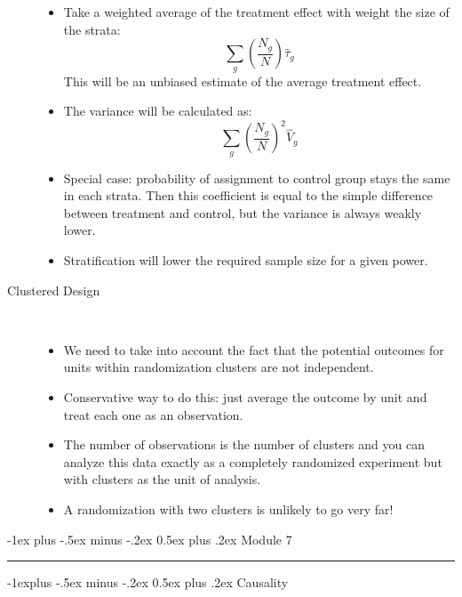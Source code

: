 \documentclass[a4paper,10pt,landscape]{article}
\makeatletter
\renewcommand{\section}{\@startsection{section}{1}{0mm}%
                                {-1ex plus -.5ex minus -.2ex}%
                                {0.5ex plus .2ex}%
                                {\normalfont\large\bfseries}}
\renewcommand{\subsection}{\@startsection{subsection}{2}{0mm}%
                                {-1explus -.5ex minus -.2ex}%
                                {0.5ex plus .2ex}%
                                {\normalfont\normalsize\bfseries}}
\makeatother
\begin{document}
\begin{multicols*}{3}
\begin{description}
\begin{itemize}[itemsep=0pt]
		\item Take a weighted average of the treatment effect with weight the size of the strata:
		$$\sum_{g}\left(\frac{N_g}{N}\right)\hat{\tau}_g$$
		This will be an unbiased estimate of the average treatment effect.
		\item The variance will be calculated as:
		$$\sum_{g}\left(\frac{N_g}{N}\right)^2\hat{V}_g$$
		\item Special case: probability of assignment to control group stays the same in each strata. Then this coefficient is equal to the simple difference between treatment and control, but the variance is always weakly lower.
		\item Stratification will lower the required sample size for a given power.
	\end{itemize}
	\item[Clustered Design] ~
	\begin{itemize}[noitemsep,topsep=0pt]
		\item We need to take into account the fact that the potential outcomes for units within randomization clusters are not independent.
		\item Conservative way to do this: just average the outcome by unit and treat each one as an observation.
		\item The number of observations is the number of clusters and you can analyze this data exactly as a completely randomized experiment but with clusters as the unit of analysis.
		\item A randomization with two clusters is unlikely to go very far!
	\end{itemize}
\end{description}

\section{Module 7}\smallskip \hrule height 1pt \smallskip

\subsection{Causality}


\end{multicols*}
\end{document}
